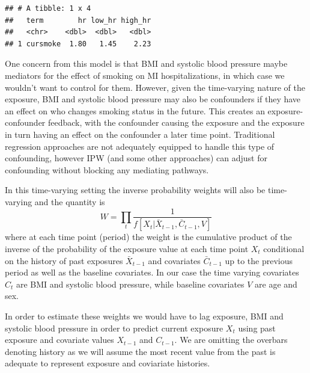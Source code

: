 \documentclass[
]{book}
\begin{document}
\begin{verbatim}
## # A tibble: 1 x 4
##   term        hr low_hr high_hr
##   <chr>    <dbl>  <dbl>   <dbl>
## 1 cursmoke  1.80   1.45    2.23
\end{verbatim}

One concern from this model is that BMI and systolic blood pressure maybe mediators for the effect of smoking on MI hospitalizations, in which case we wouldn't want to control for them. However, given the time-varying nature of the exposure, BMI and systolic blood pressure may also be confounders if they have an effect on who changes smoking status in the future. This creates an exposure-confounder feedback, with the confounder causing the exposure and the exposure in turn having an effect on the confounder a later time point. Traditional regression approaches are not adequately equipped to handle this type of confounding, however IPW (and some other approaches) can adjust for confounding without blocking any mediating pathways.

In this time-varying setting the inverse probability weights will also be time-varying and the quantity is
\[
W=\prod_{t}\frac{1}{f[X_{t}|\bar{X}_{t-1},\bar{C}_{t-1},V]}
\]
where at each time point (period) the weight is the cumulative product of the inverse of the probability of the exposure value at each time point \(X_{t}\) conditional on the history of past exposures \(\bar{X}_{t-1}\) and covariates \(\bar{C}_{t-1}\) up to the previous period as well as the baseline covariates. In our case the time varying covariates \(C_{t}\) are BMI and systolic blood pressure, while baseline covariates \(V\) are age and sex.

In order to estimate these weights we would have to lag exposure, BMI and systolic blood pressure in order to predict current exposure \(X_{t}\) using past exposure and covariate values \(X_{t-1}\) and \(C_{t-1}\). We are omitting the overbars denoting history as we will assume the most recent value from the past is adequate to represent exposure and coviariate histories.
\end{document}
